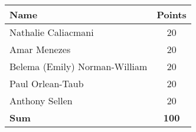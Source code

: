 \begin{center}
	\begin{tabular}{| l | c |}
		\hline
		\textbf{Name}					&	\textbf{Points} \\ \hline
		Nathalie Caliacmani				&	20				\\ \hline
		Amar Menezes					&	20				\\ \hline
		Belema (Emily) Norman-William	&	20				\\ \hline
		Paul Orlean-Taub				&	20				\\ \hline
		Anthony Sellen					&	20				\\ \hline
		\textbf{Sum}					&	\textbf{100}	\\
		\hline
	\end{tabular}
	\end{center}